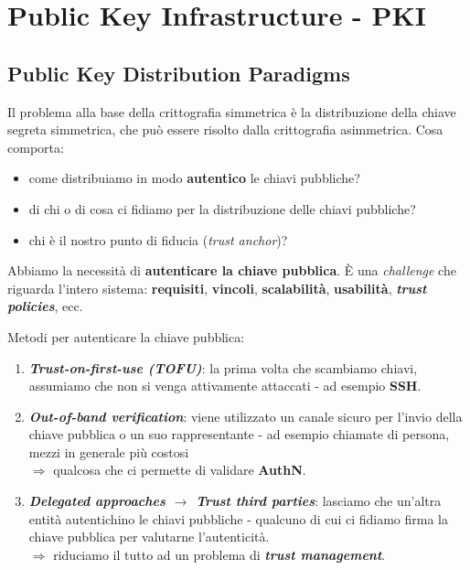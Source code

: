 \chapter{Public Key Infrastructure - PKI}

\section{Public Key Distribution Paradigms}

\begin{flushleft}

    Il problema alla base della crittografia simmetrica è la distribuzione della chiave segreta simmetrica, che può essere risolto dalla crittografia asimmetrica. Cosa comporta: 
    \begin{itemize}[nosep]
        \item come distribuiamo in modo \textbf{autentico} le chiavi pubbliche?
        \item di chi o di cosa ci fidiamo per la distribuzione delle chiavi pubbliche?
        \item chi è il nostro punto di fiducia (\textit{trust anchor})?
    \end{itemize}

    Abbiamo la necessità di \textbf{autenticare la chiave pubblica}. È una \textit{challenge} che riguarda l'intero sistema: \textbf{requisiti}, \textbf{vincoli}, \textbf{scalabilità}, \textbf{usabilità}, \textbf{\textit{trust policies}}, ecc.

    \smallskip

    Metodi per autenticare la chiave pubblica:
    \begin{enumerate}[nosep]
        \item \textbf{\textit{Trust-on-first-use (TOFU)}}: la prima volta che scambiamo chiavi, assumiamo che non si venga attivamente attaccati - ad esempio \textbf{SSH}.
        \item \textbf{\textit{Out-of-band verification}}: viene utilizzato un canale sicuro per l'invio della chiave pubblica o un suo rappresentante - ad esempio chiamate di persona, mezzi in generale più costosi \\ 
        $\Rightarrow$ qualcosa che ci permette di validare \textbf{AuthN}.
        \item \textbf{\textit{Delegated approaches $\rightarrow$ Trust third parties}}: lasciamo che un'altra entità autentichino le chiavi pubbliche - qualcuno di cui ci fidiamo firma la chiave pubblica per valutarne l'autenticità. \\
        $\Rightarrow$ riduciamo il tutto ad un problema di \textbf{\textit{trust management}}.
    \end{enumerate}


\end{flushleft}
